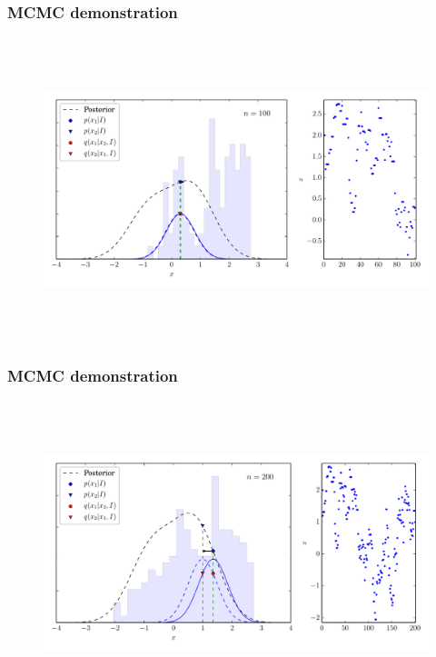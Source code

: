 \begin{frame}

\frametitle{MCMC demonstration}
\label{mcmcdemonstration}

\begin{figure}[htbp]
\centering
\includegraphics[keepaspectratio,width=\textwidth,height=250pt]{figures/mcmc_example_3.pdf}
\label{mcmc_example_3}
\end{figure}

\end{frame}

\begin{frame}

\frametitle{MCMC demonstration}
\label{mcmcdemonstration}

\begin{figure}[htbp]
\centering
\includegraphics[keepaspectratio,width=\textwidth,height=250pt]{figures/mcmc_example_4.pdf}
\label{mcmc_example_4}
\end{figure}

\end{frame}

